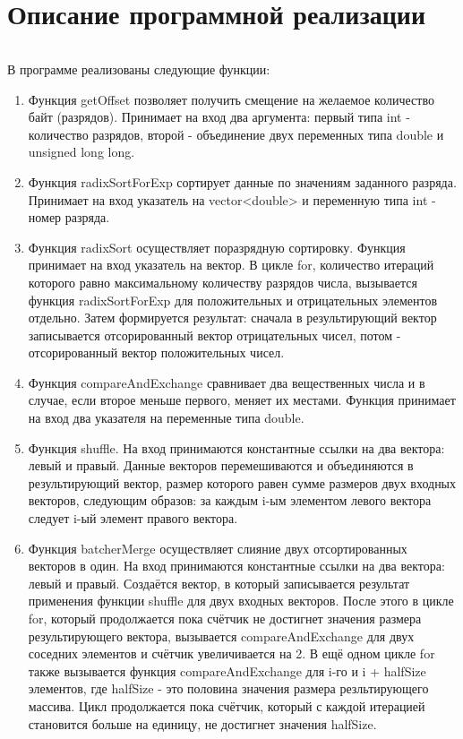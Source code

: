 \documentclass[12pt,a4paper]{article}
\begin{document}
\newpage
\part*{Описание программной реализации}
\paragraph{} В программе реализованы следующие функции:
\begin{enumerate} 
\item{Функция getOffset} позволяет получить смещение на желаемое количество байт (разрядов). Принимает на вход два аргумента: первый типа int - количество разрядов, второй - объединение двух переменных типа double и unsigned long long.
\item{Функция radixSortForExp} сортирует данные по значениям заданного разряда. Принимает на вход указатель на vector<double> и переменную типа int - номер разряда.
\item{Функция radixSort} осуществляет поразрядную сортировку. Функция принимает на вход указатель на вектор. В цикле for, количество итераций которого равно максимальному количеству разрядов числа, вызывается функция radixSortForExp для положительных и отрицательных элементов отдельно. Затем формируется результат: сначала в результирующий вектор записывается отсорированный вектор отрицательных чисел, потом - отсорированный вектор положительных чисел.
\item{Функция compareAndExchange} сравнивает два вещественных числа и в случае, если второе меньше первого, меняет их местами. Функция принимает на вход два указателя на переменные типа double.
\item{Функция shuffle}. На вход принимаются константные ссылки на два вектора: левый и правый. Данные векторов перемешиваются и объединяются в результирующий вектор, размер которого равен сумме размеров двух входных векторов, следующим образов: за каждым i-ым элементом левого вектора следует i-ый элемент правого вектора.
\item{Функция batcherMerge} осуществляет слияние двух отсортированных векторов в один. На вход принимаются константные ссылки на два вектора: левый и правый. Создаётся вектор, в который записывается результат применения функции shuffle для двух входных векторов. После этого в цикле for, который продолжается пока счётчик не достигнет значения размера результирующего вектора, вызывается compareAndExchange для двух соседних элементов и счётчик увеличивается на 2. В ещё одном цикле for также вызывается функция compareAndExchange для i-го и i + halfSize элементов, где halfSize - это половина значения размера резльтирующего массива. Цикл продолжается пока счётчик, который с каждой итерацией становится больше на единицу, не достигнет значения halfSize.

\end{enumerate}
\end{document}
